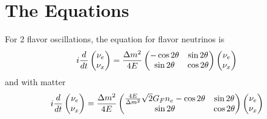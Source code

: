 \documentclass[letterpaper,12pt,english]{sphinxmanual}
\begin{document}
\section{The Equations}
\label{math:the-equations}
For 2 flavor oscillations, the equation for flavor neutrinos is
\begin{gather}
\begin{split}i \frac{d}{dt} \begin{pmatrix} \nu_e \\ \nu_x \end{pmatrix} = \frac{\Delta m^2}{4E} \begin{pmatrix} - \cos 2\theta & \sin 2\theta \\  \sin 2\theta  & \cos 2\theta   \end{pmatrix} \begin{pmatrix} \nu_e \\ \nu_x \end{pmatrix}\end{split}\notag
\end{gather}
and with matter
\begin{gather}
\begin{split}i \frac{d}{dt} \begin{pmatrix} \nu_e \\ \nu_x \end{pmatrix} = \frac{\Delta m^2}{4E} \begin{pmatrix} \frac{4E}{\Delta m^2} \sqrt{2} G_F n_e - \cos 2\theta   & \sin 2\theta \\  \sin 2\theta  &  \cos 2\theta   \end{pmatrix} \begin{pmatrix} \nu_e \\ \nu_x \end{pmatrix}\end{split}\notag
\end{gather}
\end{document}

